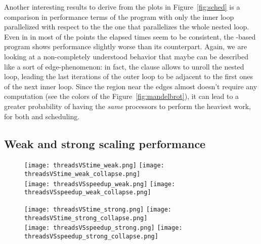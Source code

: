 Another interesting results to derive from the plots in Figure~\ref{fig:sched} is a comparison in performance terms of the program with only the inner loop parallelized with respect to the the one that parallelizes the whole nested loop. Even in in most of the points the elapsed times seem to be consistent, the -based program shows performance slightly worse than its counterpart. Again, we are looking at a non-completely understood behavior that maybe can be described like a sort of edge-phenomenon: in fact, the  clause allows to unroll the nested loop, leading the last iterations of the outer loop to be adjacent to the first ones of the next inner loop. Since the region near the edges almost doesn't require any computation (see the colors of the Figure~\ref{fig:mandelbrot}), it can lead to a greater probability of having the \emph{same} processors to perform the heaviest work, for both  and  scheduling. 

\subsection{Weak and strong scaling performance}\label{sec:res-scale}

\begin{figure}[h!]
    \centering
    \null\hfill
    \texttt{[image: threadsVStime\_weak.png]}
    \null\hfill
    \texttt{[image: threadsVStime\_weak\_collapse.png]}
    \null\hfill
    \\
    \null\hfill
    \texttt{[image: threadsVSspeedup\_weak.png]}
    \null\hfill
    \texttt{[image: threadsVSspeedup\_weak\_collapse.png]}
    \null\hfill
    \caption{\label{fig:strong_scale}}
\end{figure}

\begin{figure}[h!]
    \centering
    \null\hfill
    \texttt{[image: threadsVStime\_strong.png]}
    \null\hfill
    \texttt{[image: threadsVStime\_strong\_collapse.png]}
    \null\hfill
    \\
    \null\hfill
    \texttt{[image: threadsVSspeedup\_strong.png]}
    \null\hfill
    \texttt{[image: threadsVSspeedup\_strong\_collapse.png]}
    \null\hfill
    \caption{\label{fig:strong_scale}}
\end{figure}
